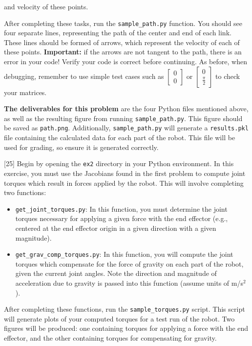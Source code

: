\documentclass{16384_doc}
\begin{document}
\begin{questions}
\begin{itemize}
        and velocity of these points.
        \end{itemize}
        After completing these tasks, run the \verb!sample_path.py! function. You
        should see four separate lines, representing the path of the center and end
        of each link. These lines should be formed of arrows, which represent the
        velocity of each of these points. \textbf{Important:} if the arrows are not
        tangent to the path, there is an error in your code! Verify your code is
        correct before continuing. As before, when debugging, remember to use
        simple test cases such as $\begin{bmatrix} 0 \\ 0 \end{bmatrix}$ or $\begin{bmatrix} 0 \\ \frac\pi2 \end{bmatrix}$ to check
        your matrices.

    \textbf{The deliverables for this problem} are the four Python files mentioned above, as well as the resulting figure from running \verb!sample_path.py!. This figure should be saved as \verb!path.png!. Additionally, \verb!sample_path.py! will generate a \verb!results.pkl! file containing the calculated data for each part of the robot. This file will be used for grading, so ensure it is generated correctly.


        [25]
Begin by opening the \verb!ex2! directory in your Python environment.
In this exercise, you must use the Jacobians found in the first problem
to compute joint torques which result in forces applied by the robot. This
will involve completing two functions:
\begin{itemize}
\item \verb!get_joint_torques.py!: In this function, you must determine
the joint torques necessary for applying a given force with the end
effector (e.g., centered at the end effector origin in a given
direction with a given magnitude).
\item \verb!get_grav_comp_torques.py!: In this function, you will
compute the joint torques which compensate for the force of gravity on
each part of the robot, given the current joint angles.  Note the
direction and magnitude of acceleration due to gravity is passed into
this function (assume units of m/s$^2$).
\end{itemize}
After completing these functions, run the \verb!sample_torques.py! script.
This script will generate plots of your computed torques for a test run of the robot.
Two figures will be produced: one containing torques for applying a
force with the end effector, and the other containing torques for
compensating for gravity.


\end{questions}
\end{document}
